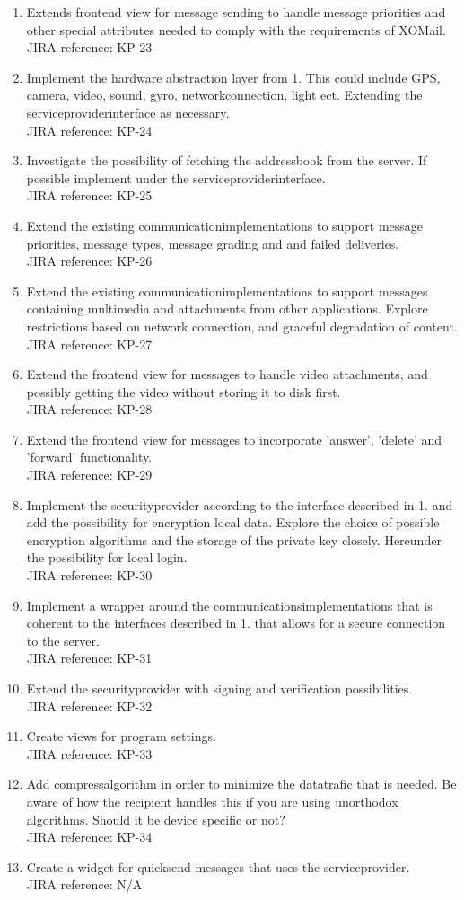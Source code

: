 \documentclass[a4paper, norsk, 12pt]{article}
\newcommand{\JIRA}[1]{\\JIRA reference: #1}
\begin{document}
\begin{enumerate}
			\item Extends frontend view for message sending to handle message priorities and other special attributes needed to comply with the requirements of XOMail.
				\JIRA{KP-23}
			
			\item Implement the hardware abstraction layer from 1. 
				This could include GPS, camera, video, sound, gyro, networkconnection, light ect. Extending the serviceproviderinterface as necessary.
				\JIRA{KP-24}
				
			\item Investigate the possibility of fetching the addressbook from the server. 
				If possible implement under the serviceproviderinterface.
				\JIRA{KP-25}
				
			\item Extend the existing communicationimplementations to support message priorities, message types, message grading and and failed deliveries.
				\JIRA{KP-26}
			
			\item Extend the existing communicationimplementations to support messages containing multimedia and attachments from other applications.
				Explore restrictions based on network connection, and graceful degradation of content. 
				\JIRA{KP-27}
			
			\item Extend the frontend view for messages to handle video attachments, and possibly getting the video without storing it to disk first.	
				\JIRA{KP-28}
			
			\item Extend the frontend view for messages to incorporate 'answer', 'delete' and 'forward' functionality.
				\JIRA{KP-29}
						
			\item Implement the securityprovider according to the interface described in 1. and add the possibility for encryption local data.
				Explore the choice of possible encryption algorithms and the storage of the private key closely. Hereunder the possibility for local login.
				\JIRA{KP-30}
			
			\item Implement a wrapper around the communicationsimplementations that is coherent to the interfaces described in 1. that allows for a secure connection to the server.
				\JIRA{KP-31}
			
			\item Extend the securityprovider with signing and verification possibilities.
				\JIRA{KP-32}
			
			\item Create views for program settings.
				\JIRA{KP-33}
			
			\item Add compressalgorithm in order to minimize the datatrafic that is needed.
				Be aware of how the recipient handles this if you are using unorthodox algorithms. Should it be device specific or not?
				\JIRA{KP-34}
			
			\item Create a widget for quicksend messages that uses the serviceprovider.
				\JIRA{N/A}
		\end{enumerate}
	\pagebreak
\end{document}
